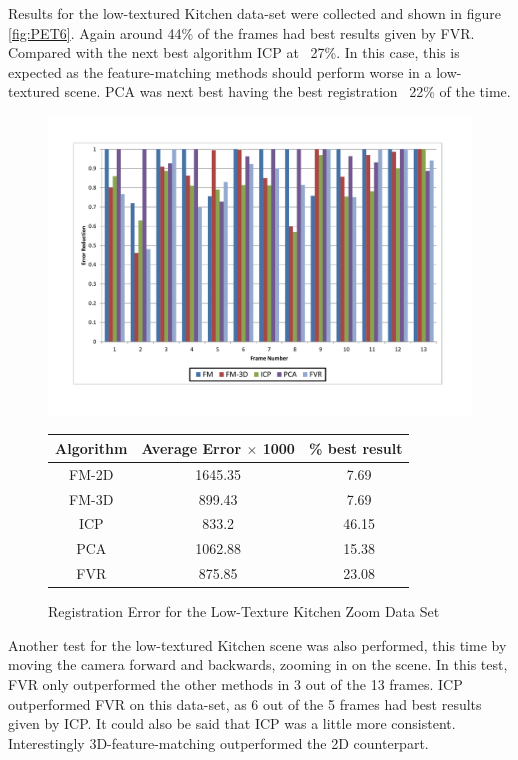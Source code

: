 Results for the low-textured Kitchen data-set were collected and shown in figure \ref{fig:PET6}. Again around 44\% of the frames had best results given by FVR. Compared with the next best algorithm ICP at ~27\%. In this case, this is expected as the feature-matching methods should perform worse in a low-textured scene. PCA was next best having the best registration ~22\% of the time. \\


\begin{figure}
\centering
\includegraphics[width=6in]{images/results/Kitchen_Little_Texture_Zoom}
\caption{Registration Error for the Low-Texture Kitchen Zoom Data Set}
\label{fig:PET7}

\begin{tabular}{ccc}
\hline
\textbf{Algorithm} & \textbf{Average Error $\times$ 1000} & \textbf{\% best result}\\ \hline
FM-2D	& 1645.35 & ~7.69\\
FM-3D	& 899.43 & ~7.69\\
ICP		& 833.2 & ~46.15\\
PCA		& 1062.88 & ~15.38\\
FVR		& 875.85 & ~23.08\\
\end{tabular}
\label{tab:PET7ST}
\end{figure} 



Another test for the low-textured Kitchen scene was also performed, this time by moving the camera forward and backwards, zooming in on the scene. In this test, FVR only outperformed the other methods in 3 out of the 13 frames. ICP outperformed FVR on this data-set, as 6 out of the 5 frames had best results given by ICP. It could also be said that ICP was a little more consistent. Interestingly 3D-feature-matching outperformed the 2D counterpart. \\



